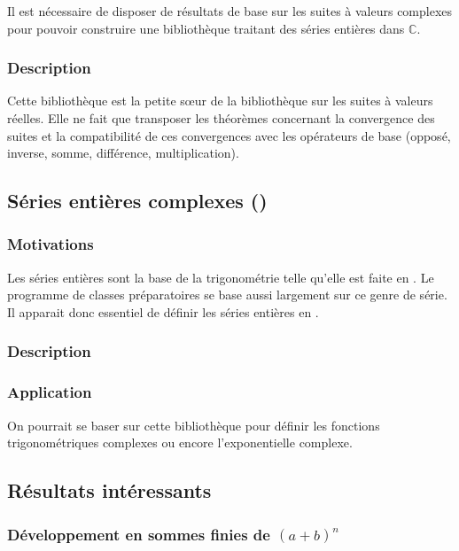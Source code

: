 Il est nécessaire de disposer de résultats de base sur les suites à valeurs complexes pour pouvoir construire une bibliothèque traitant des séries entières dans $\mathbb{C}$.

\subsubsection{Description}

Cette bibliothèque est la petite s\oe{}ur de la bibliothèque sur les suites à valeurs réelles. Elle ne fait que transposer les théorèmes concernant la convergence des suites et la compatibilité de ces convergences avec les opérateurs de base (opposé, inverse, somme, différence, multiplication).

\subsection{Séries entières complexes ()}

\subsubsection{Motivations}

Les séries entières sont la base de la trigonométrie telle qu'elle est faite en \Coq{}. Le programme de classes préparatoires se base aussi largement sur ce genre de série. Il apparait donc essentiel de définir les séries entières en \Coq{}.

\subsubsection{Description}



\subsubsection{Application}

On pourrait se baser sur cette bibliothèque pour définir les fonctions trigonométriques complexes ou encore l'exponentielle complexe.

\subsection{Résultats intéressants}

\subsubsection{D\'eveloppement en sommes finies de $(a + b) ^ n$}

